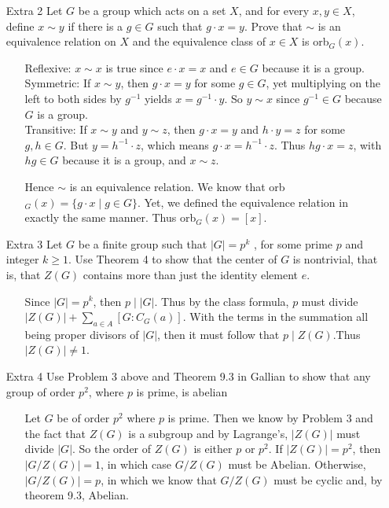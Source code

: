 \documentclass[12pt]{article}
\begin{document}
\begin{enumerate}
\item[Extra 2] Let $G$ be a group which acts on a set $X$, and for every $x, y \in X$, define
$x \sim y$ if there is a $g \in G$ such that $g \cdot x = y$. Prove that $\sim$ is an equivalence relation on $X$ and the equivalence class of $x \in X$ is orb$_G(x)$.
\begin{enumerate}
\item[] Reflexive: $x \sim x$ is true since $e \cdot x = x$ and $e \in G$ because it is a group. \\
Symmetric: If $x \sim y$, then $g \cdot x = y$ for some $g \in G$, yet multiplying on the left to both
sides by $g^{-1}$ yields $x = g^{-1} \cdot y$. So $y \sim x$ since $g^{-1} \in G$ because $G$ is a group. \\
Transitive: If $x \sim y$ and $y \sim z$, then $g \cdot x = y$ and $h \cdot y = z$ for some $g, h \in G$. 
But $y = h^{-1} \cdot z$, which means $g \cdot x = h^{-1} \cdot z$. Thus $hg \cdot x = z$, with $hg \in G$ because
it is a group, and $x \sim z$. 

Hence $\sim$ is an equivalence relation.
We know that orb$_G(x) = \{ g \cdot x \mid g \in G \}$. Yet, we defined the equivalence relation in exactly
the same manner. Thus orb$_G(x) = [x]$.
\end{enumerate}

\item[Extra 3] Let $G$ be a finite group such that $|G| = p^k$ , for some prime $p$ and integer
$k \geq 1$. Use Theorem 4 to show that the center of $G$ is nontrivial, that is,
that $Z(G)$ contains more than just the identity element $e$.
\begin{enumerate}
\item[] Since $|G| = p^k$, then $p \mid |G|$. Thus by the class formula, $p$ must divide 
$|Z(G)| + \sum_{a \in A}[G : C_G(a)]$. With the terms in the summation all being proper divisors of $|G|$, then
it must follow that $p \mid Z(G)$.Thus $|Z(G)| \neq 1$.
\end{enumerate}

\item[Extra 4] Use Problem 3 above and Theorem 9.3 in Gallian to show that any
group of order $p^2$, where $p$ is prime, is abelian
\begin{enumerate}
\item[] Let $G$ be of order $p^2$ where $p$ is prime. Then we know by Problem 3 and the fact that $Z(G)$ is a subgroup
and by Lagrange's, $|Z(G)|$ must divide $|G|$. So the order of $Z(G)$ is either $p$ or $p^2$. If $|Z(G)| = p^2$, then
$|G/Z(G)| = 1$, in which case $G/Z(G)$ must be Abelian. Otherwise, $|G/Z(G)| = p$, in which we know that $G/Z(G)$ must be
cyclic and, by theorem 9.3, Abelian.
\end{enumerate}

\end{enumerate}
\end{document}
